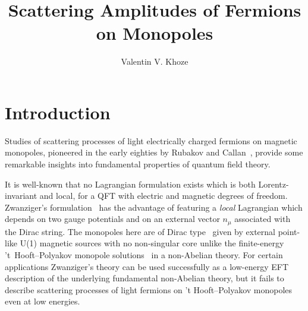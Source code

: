 \documentclass[a4paper,11pt]{article}
\title{\boldmath Scattering Amplitudes of Fermions on Monopoles}
\author{Valentin V. Khoze}
\affiliation{IPPP, Department of Physics, Durham University, Durham DH1 3LE, UK}
\begin{document}

\maketitle
\flushbottom


\section{\label{Sec:Intro}Introduction}

Studies of scattering processes of light electrically charged fermions on magnetic monopoles, pioneered in the early eighties by 
Rubakov and Callan~\cite{Rubakov:1981rg,Callan:1982ah,Callan:1982au},
provide some remarkable insights into fundamental properties of quantum field theory.


It is well-known that no Lagrangian formulation exists which is both Lorentz-invariant and local, for a QFT with electric and magnetic degrees of freedom.
Zwanziger's formulation~\cite{Zwanziger:1970hk} has the advantage of featuring a {\it local} Lagrangian which depends on two gauge potentials and on an external
vector $n_\mu$ associated with the Dirac string.
The monopoles here are of Dirac type~\cite{Dirac:1931kp} given by external point-like U(1) magnetic sources 
with no non-singular core unlike the  finite-energy 't~Hooft--Polyakov monopole solutions~\cite{tHooft:1974kcl,Polyakov:1974ek} in a non-Abelian theory.
For certain applications Zwanziger's theory can be used successfully as a low-energy EFT description of the underlying fundamental non-Abelian theory,
but it fails to describe scattering processes of light fermions on 't Hooft--Polyakov monopoles even at low energies.
\end{document}
